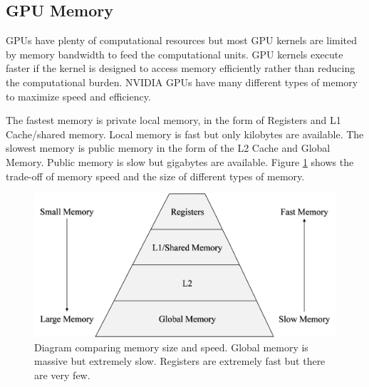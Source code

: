 \subsection{GPU Memory}
\label{sec:GPU_memory}
GPUs have plenty of computational resources but most GPU kernels are limited by memory bandwidth to feed the computational units.
GPU kernels execute faster if the kernel is designed to access memory efficiently rather than reducing the computational burden.
NVIDIA GPUs have many different types of memory to maximize speed and efficiency.

The fastest memory is private local memory,
in the form of Registers and L1 Cache/shared memory.
Local memory is fast but only kilobytes are available.
The slowest memory is public memory in the form of the L2 Cache and Global Memory.
Public memory is slow but gigabytes are available.
Figure \ref{fig:MemoryPyramid} shows the trade-off of memory speed and the size of different types of memory.
\begin{figure}
	\centering\includegraphics[width=8.36in/100*55]{figures/gpu_intro/MemoryPyramid.pdf}
	\caption{Diagram comparing memory size and speed. Global memory is massive but extremely slow. Registers are extremely fast but there are very few.}
	\label{fig:MemoryPyramid}
\end{figure}

